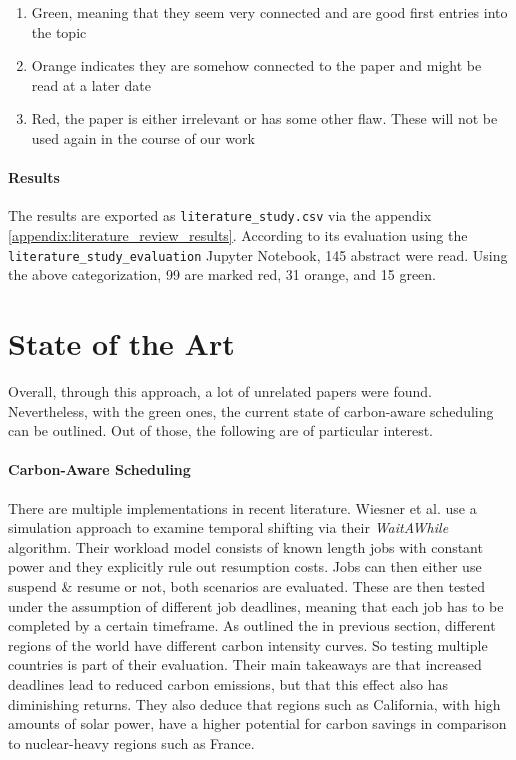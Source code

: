 \begin{enumerate}
    \item Green, meaning that they seem very connected and are good first entries into the topic
    \item Orange indicates they are somehow connected to the paper and might be read at a later date
    \item Red, the paper is either irrelevant or has some other flaw. These will not be used again in the course of our work
\end{enumerate}

\paragraph{Results}

The results are exported as \verb|literature_study.csv| via the appendix \ref{appendix:literature_review_results}. 
According to its evaluation using the \verb|literature_study_evaluation| Jupyter Notebook, 145 abstract were read. 
Using the above categorization, 99 are marked red, 31 orange, and 15 green.

\section{State of the Art} \label{sec:state_of_the_art}

Overall, through this approach, a lot of unrelated papers were found.
Nevertheless, with the green ones, the current state of carbon-aware scheduling can be outlined.
Out of those, the following are of particular interest.

\paragraph{Carbon-Aware Scheduling}
There are multiple implementations in recent literature. Wiesner et al. \cite{wiesner_lets_2021} use a simulation approach to examine temporal shifting via their \emph{WaitAWhile} algorithm. 
Their workload model consists of known length jobs with constant power and they explicitly rule out resumption costs. 
Jobs can then either use suspend \& resume or not, both scenarios are evaluated. 
These are then tested under the assumption of different job deadlines, meaning that each job has to be completed by a certain timeframe. 
As outlined the in previous section, different regions of the world have different carbon intensity curves. 
So testing multiple countries is part of their evaluation.
Their main takeaways are that increased deadlines lead to reduced carbon emissions, but that this effect also has diminishing returns. 
They also deduce that regions such as California, with high amounts of solar power, have a higher potential for carbon savings in comparison to nuclear-heavy regions such as France.

